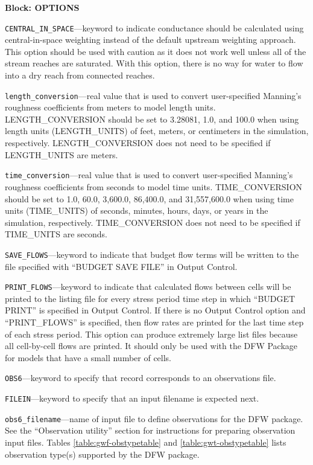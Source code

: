 
\item \textbf{Block: OPTIONS}

\begin{description}
\item \texttt{CENTRAL\_IN\_SPACE}---keyword to indicate conductance should be calculated using central-in-space weighting instead of the default upstream weighting approach.  This option should be used with caution as it does not work well unless all of the stream reaches are saturated.  With this option, there is no way for water to flow into a dry reach from connected reaches.

\item \texttt{length\_conversion}---real value that is used to convert user-specified Manning's roughness coefficients from meters to model length units. LENGTH\_CONVERSION should be set to 3.28081, 1.0, and 100.0 when using length units (LENGTH\_UNITS) of feet, meters, or centimeters in the simulation, respectively. LENGTH\_CONVERSION does not need to be specified if LENGTH\_UNITS are meters.

\item \texttt{time\_conversion}---real value that is used to convert user-specified Manning's roughness coefficients from seconds to model time units. TIME\_CONVERSION should be set to 1.0, 60.0, 3,600.0, 86,400.0, and 31,557,600.0 when using time units (TIME\_UNITS) of seconds, minutes, hours, days, or years in the simulation, respectively. TIME\_CONVERSION does not need to be specified if TIME\_UNITS are seconds.

\item \texttt{SAVE\_FLOWS}---keyword to indicate that budget flow terms will be written to the file specified with ``BUDGET SAVE FILE'' in Output Control.

\item \texttt{PRINT\_FLOWS}---keyword to indicate that calculated flows between cells will be printed to the listing file for every stress period time step in which ``BUDGET PRINT'' is specified in Output Control. If there is no Output Control option and ``PRINT\_FLOWS'' is specified, then flow rates are printed for the last time step of each stress period.  This option can produce extremely large list files because all cell-by-cell flows are printed.  It should only be used with the DFW Package for models that have a small number of cells.

\item \texttt{OBS6}---keyword to specify that record corresponds to an observations file.

\item \texttt{FILEIN}---keyword to specify that an input filename is expected next.

\item \texttt{obs6\_filename}---name of input file to define observations for the DFW package. See the ``Observation utility'' section for instructions for preparing observation input files. Tables \ref{table:gwf-obstypetable} and \ref{table:gwt-obstypetable} lists observation type(s) supported by the DFW package.

\end{description}
